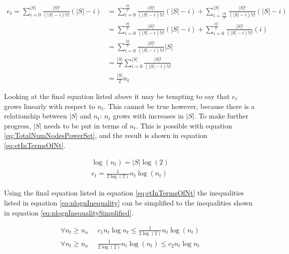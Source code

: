 \documentclass{article}
\begin{document}
\begin{equation*}
    \begin{split}
        e_t=\sum_{i=0}^{|S|}\frac{|S|!}{(|S|-i)!i!}\left(|S|-i\right)&=
        \sum_{i=0}^{\frac{|S|}{2}}\frac{|S|!}{(|S|-i)!i!}\left(|S|-i\right)+
        \sum_{i=\frac{|S|}{2}}^{|S|}\frac{|S|!}{(|S|-i)!i!}\left(|S|-i\right)
        \\
        &=
        \sum_{i=0}^{\frac{|S|}{2}}\frac{|S|!}{(|S|-i)!i!}\left(|S|-i\right)+
        \sum_{i=0}^{\frac{|S|}{2}}\frac{|S|!}{(|S|-i)!i!}\left(i\right)
        \\
        &=
        \sum_{i=0}^{\frac{|S|}{2}}\frac{|S|!}{(|S|-i)!i!}|S|
        \\
        &=
        \frac{|S|}{2}\sum_{i=0}^{|S|}\frac{|S|!}{(|S|-i)!i!}
        \\
        &=
        \frac{|S|}{2}n_t
    \end{split}
\end{equation*}

Looking at the final equation listed above it may be tempting to say that $e_t$ grows linearly with respect to $n_t$. This cannot be true however, because there is a relationship between $|S|$ and $n_t$: $n_t$ grows with increases in $|S|$. To make further progress, $|S|$ needs to be put in terms of $n_t$. This is possible with equation \ref{eq:TotalNumNodesPowerSet}, and the result is shown in equation \ref{eq:etInTermsOfNt}.

\begin{equation}
    \begin{split}
        \log(n_t)=|S|\log(2) \\
        e_t=\frac{1}{2\log(2)}n_t\log(n_t)
    \end{split}
    \label{eq:etInTermsOfNt}
\end{equation}

Using the final equation listed in equation \ref{eq:etInTermsOfNt} the inequalities listed in equation \ref{eq:nlognInequality} can be simplified to the inequalities shown in equation \ref{eq:nlognInequalitySimplified}.

\begin{equation}
    \begin{split}
        \forall n_t\ge n_o \;\; &
        c_1 n_t \log n_t \le \frac{1}{2\log(2)}n_t\log(n_t)
        \\
        \forall n_t\ge n_o \;\; &
        \frac{1}{2\log(2)}n_t\log(n_t) \le c_2 n_t \log n_t
    \end{split}
    \label{eq:nlognInequalitySimplified}
\end{equation}
\end{document}
